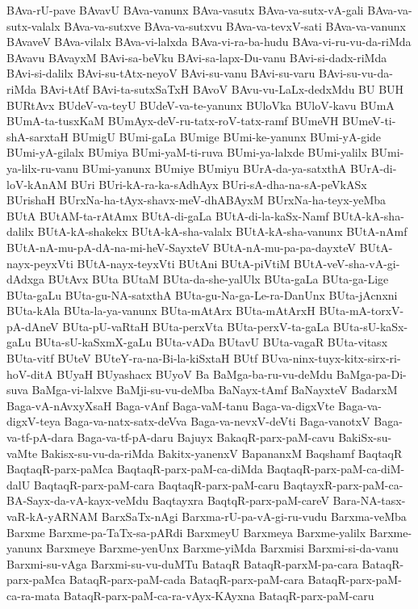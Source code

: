 {BAva-rU-pave
BAvavU
BAva-vanunx
BAva-vasutx
BAva-va-sutx-vA-gali
BAva-va-sutx-valalx
BAva-va-sutxve
BAva-va-sutxvu
BAva-va-tevxV-sati
BAva-va-vanunx
BAvaveV
BAva-vilalx
BAva-vi-lalxda
BAva-vi-ra-ba-hudu
BAva-vi-ru-vu-da-riMda
BAvavu
BAvayxM
BAvi-sa-beVku
BAvi-sa-lapx-Du-vanu
BAvi-si-dadx-riMda
BAvi-si-dalilx
BAvi-su-tAtx-neyoV
BAvi-su-vanu
BAvi-su-varu
BAvi-su-vu-da-riMda
BAvi-tAtf
BAvi-ta-sutxSaTxH
BAvoV
BAvu-vu-LaLx-dedxMdu
BU
BUH
BURtAvx
BUdeV-va-teyU
BUdeV-va-te-yanunx
BUloVka
BUloV-kavu
BUmA
BUmA-ta-tusxKaM
BUmAyx-deV-ru-tatx-roV-tatx-ramf
BUmeVH
BUmeV-ti-shA-sarxtaH
BUmigU
BUmi-gaLa
BUmige
BUmi-ke-yanunx
BUmi-yA-gide
BUmi-yA-gilalx
BUmiya
BUmi-yaM-ti-ruva
BUmi-ya-lalxde
BUmi-yalilx
BUmi-ya-lilx-ru-vanu
BUmi-yanunx
BUmiye
BUmiyu
BUrA-da-ya-satxthA
BUrA-di-loV-kAnAM
BUri
BUri-kA-ra-ka-sAdhAyx
BUri-sA-dha-na-sA-peVkASx
BUrishaH
BUrxNa-ha-tAyx-shavx-meV-dhABAyxM
BUrxNa-ha-teyx-yeMba
BUtA
BUtAM-ta-rAtAmx
BUtA-di-gaLa
BUtA-di-la-kaSx-Namf
BUtA-kA-sha-dalilx
BUtA-kA-shakekx
BUtA-kA-sha-valalx
BUtA-kA-sha-vanunx
BUtA-nAmf
BUtA-nA-mu-pA-dA-na-mi-heV-SayxteV
BUtA-nA-mu-pa-pa-dayxteV
BUtA-nayx-peyxVti
BUtA-nayx-teyxVti
BUtAni
BUtA-piVtiM
BUtA-veV-sha-vA-gi-dAdxga
BUtAvx
BUta
BUtaM
BUta-da-she-yalUlx
BUta-gaLa
BUta-ga-Lige
BUta-gaLu
BUta-gu-NA-satxthA
BUta-gu-Na-ga-Le-ra-DanUnx
BUta-jAcnxni
BUta-kAla
BUta-la-ya-vanunx
BUta-mAtArx
BUta-mAtArxH
BUta-mA-torxV-pA-dAneV
BUta-pU-vaRtaH
BUta-perxVta
BUta-perxV-ta-gaLa
BUta-sU-kaSx-gaLu
BUta-sU-kaSxmX-gaLu
BUta-vADa
BUtavU
BUta-vagaR
BUta-vitasx
BUta-vitf
BUteV
BUteY-ra-na-Bi-la-kiSxtaH
BUtf
BUva-ninx-tuyx-kitx-sirx-ri-hoV-ditA
BUyaH
BUyashacx
BUyoV
Ba
BaMga-ba-ru-vu-deMdu
BaMga-pa-Di-suva
BaMga-vi-lalxve
BaMji-su-vu-deMba
BaNayx-tAmf
BaNayxteV
BadarxM
Baga-vA-nAvxyXsaH
Baga-vAnf
Baga-vaM-tanu
Baga-va-digxVte
Baga-va-digxV-teya
Baga-va-natx-satx-deVva
Baga-va-nevxV-deVti
Baga-vanotxV
Baga-va-tf-pA-dara
Baga-va-tf-pA-daru
Bajuyx
BakaqR-parx-paM-cavu
BakiSx-su-vaMte
Bakisx-su-vu-da-riMda
Bakitx-yanenxV
BapananxM
Baqshamf
BaqtaqR
BaqtaqR-parx-paMca
BaqtaqR-parx-paM-ca-diMda
BaqtaqR-parx-paM-ca-diM-dalU
BaqtaqR-parx-paM-cara
BaqtaqR-parx-paM-caru
BaqtayxR-parx-paM-ca-BA-Sayx-da-vA-kayx-veMdu
Baqtayxra
BaqtqR-parx-paM-careV
Bara-NA-tasx-vaR-kA-yARNAM
BarxSaTx-nAgi
Barxma-rU-pa-vA-gi-ru-vudu
Barxma-veMba
Barxme
Barxme-pa-TaTx-sa-pARdi
BarxmeyU
Barxmeya
Barxme-yalilx
Barxme-yanunx
Barxmeye
Barxme-yenUnx
Barxme-yiMda
Barxmisi
Barxmi-si-da-vanu
Barxmi-su-vAga
Barxmi-su-vu-duMTu
BataqR
BataqR-parxM-pa-cara
BataqR-parx-paMca
BataqR-parx-paM-cada
BataqR-parx-paM-cara
BataqR-parx-paM-ca-ra-mata
BataqR-parx-paM-ca-ra-vAyx-KAyxna
BataqR-parx-paM-caru
}
